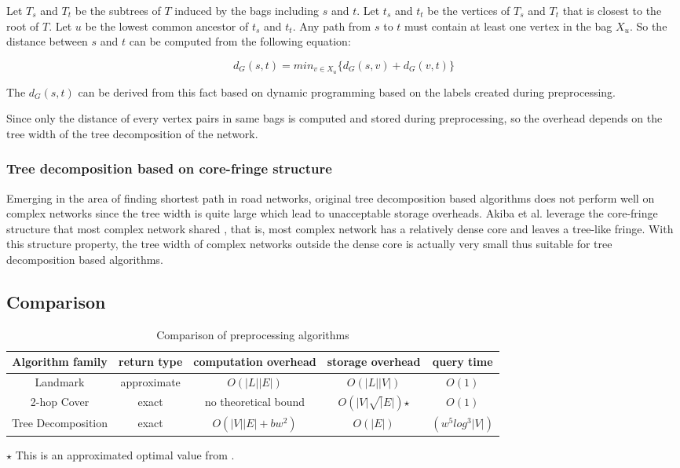Let $T_s$ and $T_t$ be the subtrees of $T$ induced by the bags including $s$ and $t$. Let $t_s$ and $t_t$ be the vertices of $T_s$ and $T_t$ that is closest to the root of $T$. Let $u$ be the lowest common ancestor of $t_s$ and $t_t$. Any path from $s$ to $t$ must contain at least one vertex in the bag $X_u$. So the distance between $s$ and $t$ can be computed from the following equation:

\[
    d_G(s,t) = min_{v \in X_u}\{d_G(s,v)+d_G(v,t)\}
\]

The $d_G(s,t)$ can be derived from this fact based on dynamic programming based on the labels created during preprocessing.

Since only the distance of every vertex pairs in same bags is computed and stored during preprocessing, so the overhead depends on the tree width of the tree decomposition of the network.

\subsubsection{Tree decomposition based on core-fringe structure}

Emerging in the area of finding shortest path in road networks, original tree decomposition based algorithms does not perform well on complex networks since the tree width is quite large which lead to unacceptable storage overheads. Akiba et al. leverage the core-fringe structure that most complex network shared \cite{Akiba:2012:SQC:2247596.2247614}, that is, most complex network has a relatively dense core and leaves a tree-like fringe. With this structure property, the tree width of complex networks outside the dense core is actually very small thus suitable for tree decomposition based algorithms.  

\subsection{Comparison}

\begin{table*}
    \centering
    \begin{tabular}{|c|c|c|c|c|} \hline
        Algorithm family & return type & computation overhead & storage overhead & query time \\ \hline
        Landmark & approximate & $O(|L||E|)$ & $O(|L||V|)$ & $O(1)$ \\ \hline
        2-hop Cover & exact & no theoretical bound & $O(|V|\sqrt|E|)$$\star$ & $O(1)$ \\ \hline
        Tree Decomposition & exact & $O(|V||E|+bw^2)$ & $O(|E|)$ & $(w^5log^3|V|)$ \\ \hline
    \end{tabular}
    \begin{tablenotes}
        \small
        \item $\star$ This is an approximated optimal value from \cite{Cohen:2002:RDQ:545381.545503}.
    \end{tablenotes}
    \caption{Comparison of preprocessing algorithms}
    \label{table:comparison}
\end{table*}

